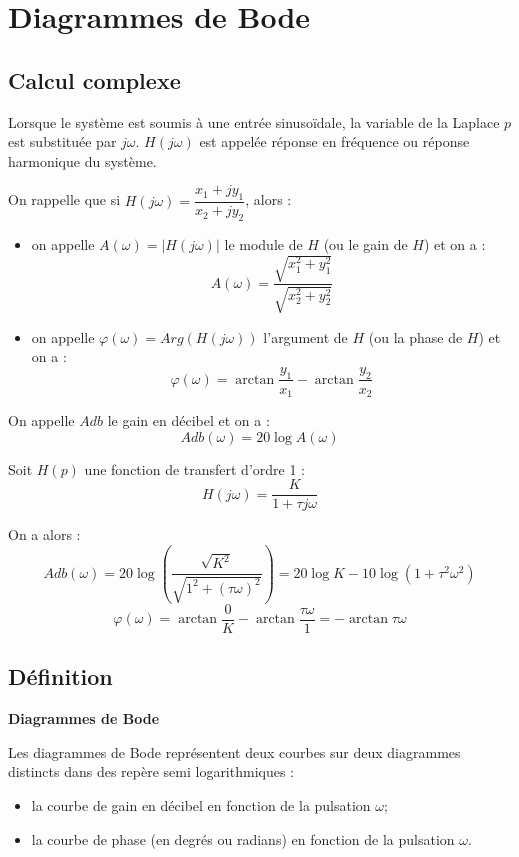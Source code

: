 \documentclass[10pt,oneside]{article}
\begin{document}
\section{Diagrammes de Bode}

\subsection{Calcul complexe}
Lorsque le système est soumis à une entrée sinusoïdale, la variable de la Laplace $p$ est substituée par $j\omega$. $H(j\omega)$ est appelée réponse en fréquence ou réponse harmonique du système.

\begin{resultat}
On rappelle que si $H(j\omega) = \dfrac{x_1+jy_1}{x_2+jy_2}$, alors : 
\begin{itemize}
\item on appelle $A(\omega)=|H(j\omega)|$ le module de $H$ (ou le gain de $H$) et on a : 
$$
A(\omega)= \dfrac{\sqrt{x_1^2+y_1^2}}{\sqrt{x_2^2+y_2^2}}
$$
\item on appelle $\varphi(\omega)=Arg(H(j\omega))$ l'argument de $H$ (ou la phase de $H$) et on a : 
$$
\varphi(\omega)= \arctan \dfrac{y_1}{x_1}-\arctan \dfrac{y_2}{x_2}
$$
\end{itemize}
\end{resultat}

\begin{rem}
On appelle $Adb$ le gain en décibel et on a :
$$
Adb(\omega)=20 \log A(\omega)
$$
\end{rem}

\begin{exemple}
Soit $H(p)$ une fonction de transfert d'ordre 1 :
$$
H(j\omega)= \dfrac{K}{1+\tau j\omega }
$$

On a alors : 
$$
Adb(\omega) = 20 \log \left(\dfrac{\sqrt{K^2}}{\sqrt{1^2+(\tau\omega)^2}}\right) = 20 \log K - 10 \log \left(1+\tau^2\omega^2 \right)
$$
$$
\varphi(\omega)= \arctan \dfrac{0}{K}-\arctan \dfrac{\tau\omega}{1} = - \arctan \tau\omega
$$

\end{exemple}

\subsection{Définition}

\begin{defi}
\textbf{Diagrammes de Bode}

Les diagrammes de Bode représentent deux courbes sur deux diagrammes distincts dans des repère semi logarithmiques :
\begin{itemize}
\item la courbe de gain en décibel en fonction de la pulsation $\omega$;
\item la courbe de phase (en degrés ou radians) en fonction de la pulsation $\omega$.
\end{itemize}

\end{defi}
\end{document}
